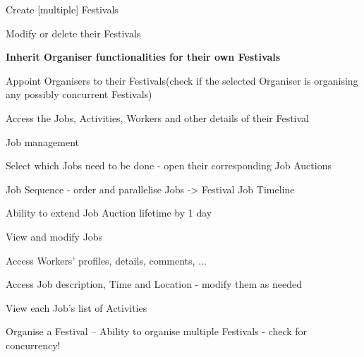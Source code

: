 \begin{packed_enum}
\begin{packed_enum}
				\end{packed_enum}
				
				\item	{}
				\begin{packed_enum}
					\item Create [multiple] Festivals
					\item Modify or delete their Festivals	
					\item \textbf{Inherit Organiser functionalities for their own Festivals}
					\item Appoint Organisers to their Festivals(check if the selected Organiser is organising any possibly concurrent Festivals)
					\item Access the Jobs, Activities, Workers and other details of their Festival
				\end{packed_enum}
				
				\item	{}
				\begin{packed_enum}
					\item Job management
					\begin{packed_enum}
						\item Select which Jobs need to be done - open their corresponding Job Auctions
						\item Job Sequence - order and parallelise Jobs -> Festival Job Timeline
						\item Ability to extend Job Auction lifetime by 1 day
						\item View and modify Jobs
						\begin{packed_enum}
							\item Access Workers' profiles, details, comments, ...
							\item Access Job description, Time and Location - modify them as needed
							\item View each Job's list of Activities
						\end{packed_enum}
					\end{packed_enum}
					
					\item Organise a Festival -- Ability to organise multiple Festivals - check for concurrency!
				\end{packed_enum}
				

\end{packed_enum}
